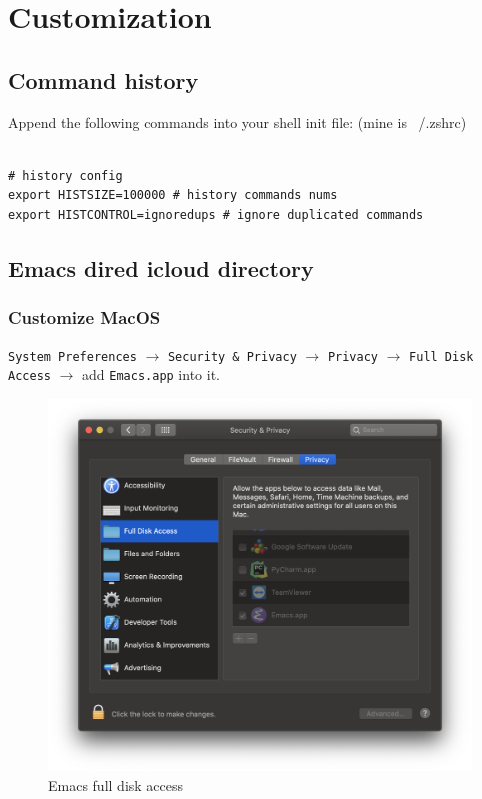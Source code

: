 
\chapter{Customization}

\section{Command history}

Append the following commands into your shell init file: (mine is ~/.zshrc)


\lstset{language=Sh}
\begin{lstlisting}
  
# history config
export HISTSIZE=100000 # history commands nums
export HISTCONTROL=ignoredups # ignore duplicated commands

\end{lstlisting}



\section{Emacs dired icloud directory}

\subsection{Customize MacOS}

\verb|System Preferences| $\rightarrow$
\verb|Security & Privacy| $\rightarrow$
\verb|Privacy| $\rightarrow$
\verb|Full Disk Access| $\rightarrow$
add \verb|Emacs.app| into it.

\begin{figure}[!ht]
  \centering
  \includegraphics[width=\textwidth]{pics/emacs-full-disk-access}
  \caption{Emacs full disk access}
  \label{fig:emacs-full-disk-access}
\end{figure}

